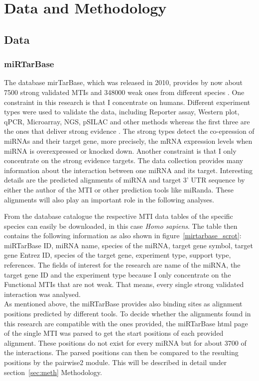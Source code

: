 \documentclass[12pt]{article}
\begin{document}
\vspace{2cm}


\section{Data and Methodology}

 
\subsection{Data} 
\subsubsection{miRTarBase}
The database mirTarBase, which was released in 2010, provides by now about 7500 strong validated MTIs and 348000 weak ones from different species \cite{Chou}. One constraint in this research is that I concentrate on humans. Different experiment types were used to validate the data, including Reporter assay, Western plot, qPCR, Microarray, NGS, pSILAC and other methods whereas the first three are the ones that deliver strong evidence \cite{Hsu}. The strong types detect the co-epression of miRNAs and their target gene, more precisely, the mRNA expression levels when miRNA is overexpressed or knocked down. Another constraint is that I only concentrate on the strong evidence targets. The data collection provides many information about the interaction between one miRNA and its target. Interesting details are the predicted alignments of miRNA and target 3' UTR sequence by either the author of the MTI or other prediction tools like miRanda. These alignments will also play an important role in the following analyses. 

From the database catalogue the respective MTI data tables of the specific species can easily be downloaded, in this case \textit{Homo sapiens}. The table then contains the following information as also shown in figure~\ref{mirtarbase_scrot}: miRTarBase ID, miRNA name, species of the miRNA, target gene symbol, target gene Entrez ID, species of the target gene, experiment type, support type, references. The fields of interest for the research are name of the miRNA, the target gene ID and the experiment type because I only concentrate on the Functional MTIs that are not weak. That means, every single strong validated interaction was analysed.\\

As mentioned above, the miRTarBase provides also binding sites as alignment positions predicted by different tools. To decide whether the alignments found in this research are compatible with the ones provided, the miRTarBase html page of the single MTI was parsed to get the start positions of each provided alignment. These positions do not exist for every miRNA but for about 3700 of the interactions. The parsed positions can then be compared to the resulting positions by the pairwise2 module. This will be described in detail under section~\ref{sec:meth} Methodology. 
\end{document}
